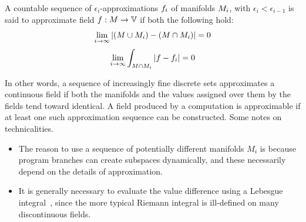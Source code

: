 \documentclass[12pt,a4paper,twoside,openright]{book}
\begin{document}
\begin{thrdefn}\label{def:approx}
  A countable sequence of $\epsilon_{i}$-approximations $f_i$ of manifolds $M_i$, with $\epsilon_{i} < \epsilon_{i-1}$ is said to approximate field $\field: \manifold \rightarrow
  \spaceof{\datavalue}$ if both the following hold:
  $$\lim_{i\rightarrow \infty} |(M \cup M_{i}) - (M \cap M_{i})| = 0$$
  $$\lim_{i\rightarrow \infty} \int_{M \cap M_{i}} |f-f_{i}| = 0$$
\end{thrdefn}
\noindent
In other words, a sequence of increasingly fine discrete sets approximates a continuous field if both the manifolds and the values assigned over them by the fields tend toward identical.
%
A field produced by a computation is approximable if at least one such approximation sequence can be constructed.
%
Some notes on technicalities.
\begin{itemize}
 \item The reason to use a sequence of potentially different manifolds $M_i$ is because program branches can create subspaces dynamically, and these necessarily depend on the details of approximation.
 \item It is generally necessary to evaluate the value difference using a Lebesgue integral~\cite{LebesgueIntegral}, since the more typical Riemann integral is ill-defined on many discontinuous fields.
\end{itemize}
\end{document}

